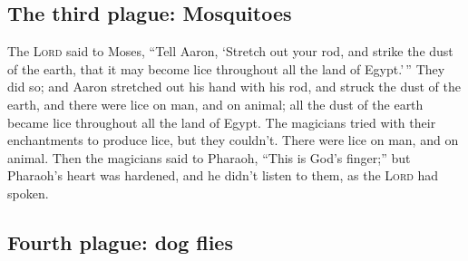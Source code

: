 \hypertarget{the-third-plague-mosquitoes}{%
\subsection{The third plague:
Mosquitoes}\label{the-third-plague-mosquitoes}}

 The \textsc{Lord} said to Moses, ``Tell Aaron, `Stretch
out your rod, and strike the dust of the earth, that it may become lice
throughout all the land of Egypt.'\,''  They did so; and
Aaron stretched out his hand with his rod, and struck the dust of the
earth, and there were lice on man, and on animal; all the dust of the
earth became lice throughout all the land of Egypt.  The
magicians tried with their enchantments to produce lice, but they
couldn't. There were lice on man, and on animal.  Then
the magicians said to Pharaoh, ``This is God's finger;'' but Pharaoh's
heart was hardened, and he didn't listen to them, as the \textsc{Lord}
had spoken.

\hypertarget{fourth-plague-dog-flies}{%
\subsection{Fourth plague: dog flies}\label{fourth-plague-dog-flies}}


